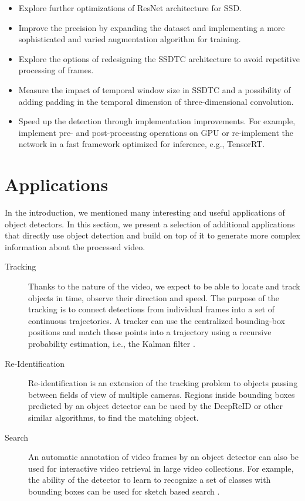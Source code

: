 \begin{itemize}
\item Explore further optimizations of ResNet architecture for SSD.

\item Improve the precision by expanding the dataset and implementing a more sophisticated and varied augmentation algorithm for training.

\item Explore the options of redesigning the SSDTC architecture to avoid repetitive processing of frames. 

\item Measure the impact of temporal window size in SSDTC and a possibility of adding padding in the temporal dimension of three-dimensional convolution.

\item Speed up the detection through implementation improvements. For example, implement pre- and post-processing operations on GPU or re-implement the network in a fast framework optimized for inference, e.g., TensorRT.
\end{itemize}

\section*{Applications}
In the introduction, we mentioned many interesting and useful applications of object detectors.  In this section, we present a selection of additional applications that directly use object detection and build on top of it to generate more complex information about the processed video.

\begin{description}
\item[Tracking] Thanks to the nature of the video, we expect to be able to locate and track objects in time, observe their direction and speed. The purpose of the tracking is to connect detections from individual frames into a set of continuous trajectories. A tracker can use the centralized bounding-box positions and match those points into a trajectory using a recursive probability estimation, i.e., the Kalman filter \cite{bib:kalman}.

\item[Re-Identification] Re-identification is an extension of the tracking problem to objects passing between fields of view of multiple cameras. Regions inside bounding boxes predicted by an object detector can be used by the DeepReID \cite{bib:reid} or other similar algorithms, to find the matching object.

\item[Search] An automatic annotation of video frames by an object detector can also be used for interactive video retrieval \cite{bib:lokoc} in large video collections.
For example, the ability of the detector to learn to recognize a set of classes with bounding boxes can be used for sketch based search \cite{bibi:vidsearch} \cite{bib:visione}.

\end{description}
